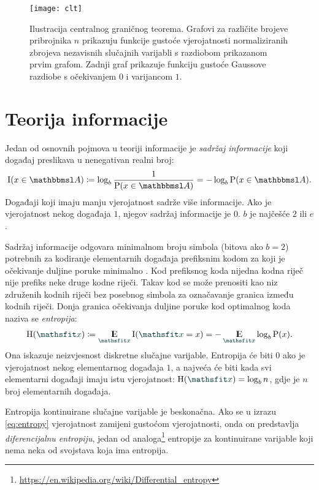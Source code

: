 \documentclass[utf8, diplomski, lmodern]{fer}
\begin{document}
\begin{figure}
	\centering
	\texttt{[image: clt]}
	\caption{Ilustracija centralnog graničnog teorema. Grafovi za različite brojeve pribrojnika $n$ prikazuju funkcije gustoće vjerojatnosti normaliziranih zbrojeva nezavisnih slučajnih varijabli s razdiobom prikazanom prvim grafom. Zadnji graf prikazuje funkciju gustoće Gaussove razdiobe s očekivanjem $0$ i varijancom $1$.}
	\label{fig:clt}
\end{figure}



\section{Teorija informacije} \label{sec:teorija-informacije}

Jedan od osnovnih pojmova u teoriji informacije je \emph{sadržaj informacije} koji događaj preslikava u nenegativan realni broj:
\begin{align}
\I(x\in\set A)\coloneqq\log_b \frac{1}{\P(x\in\set A)} = -\log_b \P(x\in\set A) \text{.}
\end{align}
Događaji koji imaju manju vjerojatnost sadrže više informacije. Ako je vjerojatnost nekog događaja $1$, njegov sadržaj informacije je $0$. $b$ je najčešće $2$ ili $e$.

Sadržaj informacije odgovara minimalnom broju simbola (bitova ako $b=2$) potrebnih za kodiranje elementarnih događaja prefiksnim kodom za koji je očekivanje duljine poruke minimalno \citep{Olah:2015:VIT}. Kod prefiksnog koda nijedna kodna riječ nije prefiks neke druge kodne riječi. Takav kod se može prenositi kao niz združenih kodnih riječi bez posebnog simbola za označavanje granica između kodnih riječi. Donja granica očekivanja duljine poruke kod optimalnog koda naziva se \emph{entropija}:
\begin{align}\label{eq:entropy}
\H(\rvar x) \coloneqq  \E_{\rvar x}\I(\rvar x=x) = -\E_{\rvar x}\log_b \P(x) \text{.}
\end{align}
Ona iskazuje neizvjesnost diskretne slučajne varijable. Entropija će biti $0$ ako je vjerojatnost nekog elementarnog događaja $1$, a najveća će biti kada svi elementarni događaji imaju istu vjerojatnost: $\H(\rvar x)=\log_b n$, gdje je $n$ broj elementarnih događaja. 

Entropija kontinuirane slučajne varijable je beskonačna. Ako se u izrazu \eqref{eq:entropy} vjerojatnost zamijeni gustoćom vjerojatnosti, onda on predstavlja \emph{diferencijalnu entropiju}, jedan od analoga\footnote{\url{https://en.wikipedia.org/wiki/Differential_entropy}} entropije za kontinuirane varijable koji nema neka od svojstava koja ima entropija.
\end{document}
